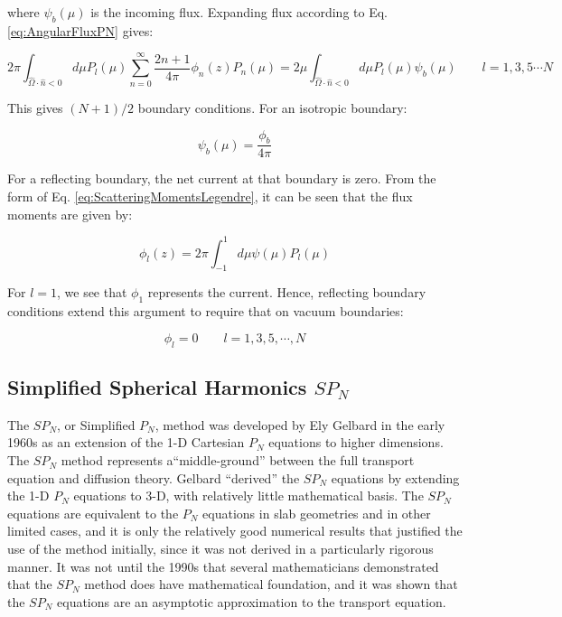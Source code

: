 \documentclass[10pt]{article}
\begin{document}
\begin{flushleft}
where \(\psi_b(\mu)\) is the incoming flux. Expanding flux according to Eq. \eqref{eq:AngularFluxPN} gives:

\begin{equation}
2\pi\int_{\hat{\Omega}\cdot\hat{n}<0}^{}d\mu P_l(\mu)\sum_{n=0}^{\infty}\frac{2n+1}{4\pi}\phi_n(z)P_n(\mu)=2\mu\int_{\hat{\Omega}\cdot\hat{n}<0}^{}d\mu P_l(\mu)\psi_b(\mu)\quad\quad l=1, 3, 5\cdots N
\end{equation}

This gives \((N+1)/2\) boundary conditions. For an isotropic boundary:

\begin{equation}
\psi_b(\mu)=\frac{\phi_b}{4\pi}
\end{equation}

For a reflecting boundary, the net current at that boundary is zero. From the form of Eq. \eqref{eq:ScatteringMomentsLegendre}, it can be seen that the flux moments are given by:

\begin{equation}
\phi_l(z)=2\pi\int_{-1}^{1}d\mu\psi(\mu)P_l(\mu)
\end{equation}

For \(l=1\), we see that \(\phi_1\) represents the current. Hence, reflecting boundary conditions extend this argument to require that on vacuum boundaries:

\begin{equation}
\phi_l=0\quad\quad l=1, 3, 5, \cdots, N
\end{equation}

\subsection{Simplified Spherical Harmonics \(SP_N\)}
\label{sec:SPN}

The \(SP_N\), or Simplified \(P_N\), method was developed by Ely Gelbard in the early 1960s as an extension of the 1-D Cartesian \(P_N\) equations to higher dimensions. The \(SP_N\) method represents a``middle-ground'' between the full transport equation and diffusion theory. Gelbard ``derived'' the \(SP_N\) equations by extending the 1-D \(P_N\) equations to 3-D, with relatively little mathematical basis. The \(SP_N\) equations are equivalent to the \(P_N\) equations in slab geometries and in other limited cases, and it is only the relatively good numerical results that justified the use of the method initially, since it was not derived in a particularly rigorous manner. It was not until the 1990s that several mathematicians demonstrated that the \(SP_N\) method does have mathematical foundation, and it was shown that the \(SP_N\) equations are an asymptotic approximation to the transport equation. 


\end{flushleft}
\end{document}
